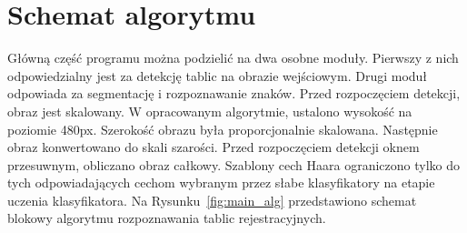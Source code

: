 \section{Schemat algorytmu}

Główną część programu można podzielić na dwa osobne moduły.
Pierwszy z nich odpowiedzialny jest za detekcję tablic na obrazie wejściowym.
Drugi moduł odpowiada za segmentację i rozpoznawanie znaków.
Przed rozpoczęciem detekcji, obraz jest skalowany.
W opracowanym algorytmie, ustalono wysokość na poziomie 480px.
Szerokość obrazu była proporcjonalnie skalowana.
Następnie obraz konwertowano do skali szarości.
Przed rozpoczęciem detekcji oknem przesuwnym, obliczano obraz całkowy.
Szablony cech Haara ograniczono tylko do tych odpowiadających cechom wybranym przez słabe klasyfikatory na etapie uczenia klasyfikatora.
Na Rysunku~\ref{fig:main_alg} przedstawiono schemat blokowy algorytmu rozpoznawania tablic rejestracyjnych.
